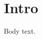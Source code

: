 \documentclass{article}
\begin{document}
\tableofcontents

\section{Intro }

Body text.

\end{document}
